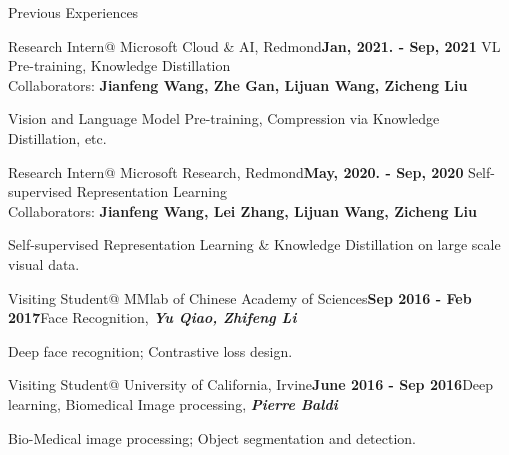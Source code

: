 \documentclass{resume} %
\begin{document}
\begin{rSection}{Previous Experiences}


\begin{rSubsection}{Research Intern@ Microsoft Cloud \& AI, Redmond}\hfill{\textbf{Jan, 2021. - Sep, 2021}}{ VL Pre-training, Knowledge Distillation \\Collaborators: \hfill\textbf{Jianfeng Wang, Zhe Gan, Lijuan Wang, Zicheng Liu}}
\item{Vision and Language Model Pre-training, Compression via Knowledge Distillation, etc. }
\end{rSubsection}

\begin{rSubsection}{Research Intern@ Microsoft Research, Redmond}\hfill{\textbf{May, 2020. - Sep, 2020}}{ Self-supervised Representation Learning \\Collaborators: \hfill \textbf{Jianfeng Wang, Lei Zhang, Lijuan Wang, Zicheng Liu}}
\item{Self-supervised Representation Learning \& Knowledge Distillation on large scale visual data.}
\end{rSubsection}

\begin{rSubsection}{Visiting Student@ MMlab of Chinese Academy of Sciences}\hfill{\textbf{Sep 2016 - Feb 2017}}{Face Recognition, \textbf{\textit{Yu Qiao, Zhifeng Li}}}{}
\item Deep face recognition; Contrastive loss design.
\end{rSubsection}

\begin{rSubsection}{Visiting Student@ University of California, Irvine}\hfill{\textbf{June 2016 - Sep 2016}}{Deep learning, Biomedical Image processing,  \textbf{\textit{Pierre Baldi}}}{}
\item Bio-Medical image processing; Object segmentation and detection.
\end{rSubsection} 

\end{rSection}
\end{document}
